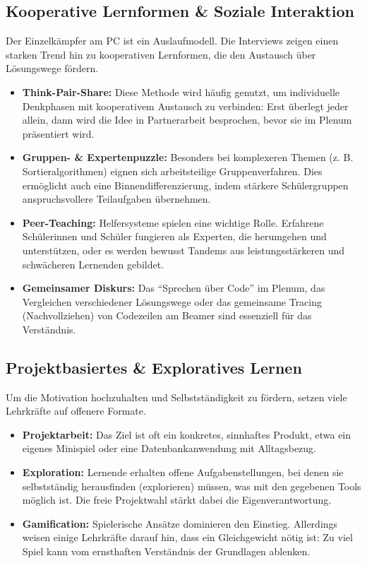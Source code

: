 \documentclass[a5paper,pagesize,10pt,bibtotoc,pointlessnumbers,
normalheadings,DIV=9,twoside=false]{scrbook}
\begin{document}
\subsection*{Kooperative Lernformen \& Soziale Interaktion}

Der Einzelkämpfer am PC ist ein Auslaufmodell. Die Interviews zeigen einen starken Trend hin zu kooperativen Lernformen, die den Austausch über Lösungswege fördern.

\begin{itemize}
    \item \textbf{Think-Pair-Share:} Diese Methode wird häufig genutzt, um individuelle Denkphasen mit kooperativem Austausch zu verbinden: Erst überlegt jeder allein, dann wird die Idee in Partnerarbeit besprochen, bevor sie im Plenum präsentiert wird.
    \item \textbf{Gruppen- \& Expertenpuzzle:} Besonders bei komplexeren Themen (z. B. Sortieralgorithmen) eignen sich arbeitsteilige Gruppenverfahren. Dies ermöglicht auch eine Binnendifferenzierung, indem stärkere Schülergruppen anspruchsvollere Teilaufgaben übernehmen.
    \item \textbf{Peer-Teaching:} Helfersysteme spielen eine wichtige Rolle. Erfahrene Schülerinnen und Schüler fungieren als Experten, die herumgehen und unterstützen, oder es werden bewusst Tandems aus leistungsstärkeren und schwächeren Lernenden gebildet.
    \item \textbf{Gemeinsamer Diskurs:} Das ``Sprechen über Code'' im Plenum, das Vergleichen verschiedener Lösungswege oder das gemeinsame Tracing (Nachvollziehen) von Codezeilen am Beamer sind essenziell für das Verständnis.
\end{itemize}

\subsection*{Projektbasiertes \& Exploratives Lernen}

Um die Motivation hochzuhalten und Selbstständigkeit zu fördern, setzen viele Lehrkräfte auf offenere Formate.

\begin{itemize}
    \item \textbf{Projektarbeit:} Das Ziel ist oft ein konkretes, sinnhaftes Produkt, etwa ein eigenes Minispiel oder eine Datenbankanwendung mit Alltagsbezug.
    \item \textbf{Exploration:} Lernende erhalten offene Aufgabenstellungen, bei denen sie selbstständig herausfinden (explorieren) müssen, was mit den gegebenen Tools möglich ist. Die freie Projektwahl stärkt dabei die Eigenverantwortung.
    \item \textbf{Gamification:} Spielerische Ansätze dominieren den Einstieg. Allerdings weisen einige Lehrkräfte darauf hin, dass ein Gleichgewicht nötig ist: Zu viel Spiel kann vom ernsthaften Verständnis der Grundlagen ablenken.
\end{itemize}
\end{document}
